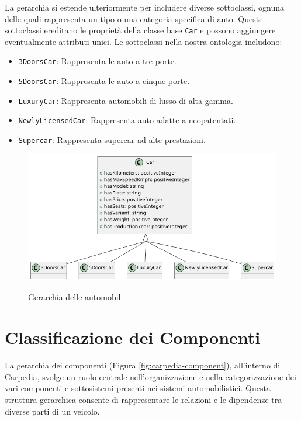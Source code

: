 La gerarchia si estende ulteriormente per includere diverse sottoclassi, ognuna delle quali rappresenta un tipo o una categoria specifica di auto. Queste sottoclassi ereditano le proprietà della classe base \texttt{Car} e possono aggiungere eventualmente attributi unici. Le sottoclassi nella nostra ontologia includono:

\begin{itemize}
    \item \texttt{3DoorsCar}: Rappresenta le auto a tre porte.
    \item \texttt{5DoorsCar}: Rappresenta le auto a cinque porte.
    \item \texttt{LuxuryCar}: Rappresenta automobili di lusso di alta gamma.
    \item \texttt{NewlyLicensedCar}: Rappresenta auto adatte a neopatentati.
    \item \texttt{Supercar}: Rappresenta supercar ad alte prestazioni.
\end{itemize}

\begin{figure}[H]
    \caption{Gerarchia delle automobili}
    \includegraphics[width=\textwidth]{figures/carpedia-car.png}
    \label{fig:carpedia-car}
\end{figure}

\section{Classificazione dei Componenti}

La gerarchia dei componenti (Figura \ref{fig:carpedia-component}), all'interno di Carpedia, svolge un ruolo centrale nell'organizzazione e nella categorizzazione dei vari componenti e sottosistemi presenti nei sistemi automobilistici. Questa struttura gerarchica consente di rappresentare le relazioni e le dipendenze tra diverse parti di un veicolo.

